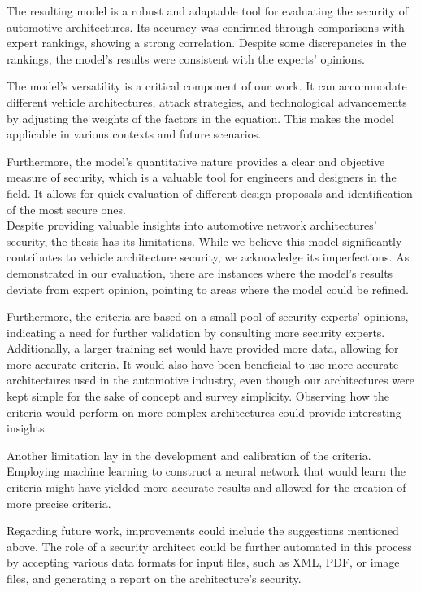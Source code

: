 The resulting model is a robust and adaptable tool for evaluating the security of automotive architectures. 
Its accuracy was confirmed through comparisons with expert rankings, showing a strong correlation. 
Despite some discrepancies in the rankings, the model's results were consistent with the experts' opinions.

The model's versatility is a critical component of our work. 
It can accommodate different vehicle architectures, attack strategies, 
and technological advancements by adjusting the weights of the factors in the equation. 
This makes the model applicable in various contexts and future scenarios.

Furthermore, the model's quantitative nature provides a clear and objective measure of security, 
which is a valuable tool for engineers and designers in the field. 
It allows for quick evaluation of different design proposals and identification of the most secure ones.\\

Despite providing valuable insights into automotive network architectures' security, the thesis has its limitations.
While we believe this model significantly contributes to vehicle architecture security, we acknowledge its imperfections. 
As demonstrated in our evaluation, there are instances where the model's results deviate from expert opinion, 
pointing to areas where the model could be refined.

Furthermore, the criteria are based on a small pool of security experts' opinions, 
indicating a need for further validation by consulting more security experts. 
Additionally, a larger training set would have provided more data, allowing for more accurate criteria. 
It would also have been beneficial to use more accurate architectures used in the automotive industry, 
even though our architectures were kept simple for the sake of concept and survey simplicity. 
Observing how the criteria would perform on more complex architectures could provide interesting insights.

Another limitation lay in the development and calibration of the criteria. 
Employing machine learning to construct a neural network that would learn the criteria might have 
yielded more accurate results and allowed for the creation of more precise criteria.

Regarding future work, improvements could include the suggestions mentioned above. 
The role of a security architect could be further automated in this process by accepting various data formats for input files, 
such as XML, PDF, or image files, and generating a report on the architecture's security.\\

